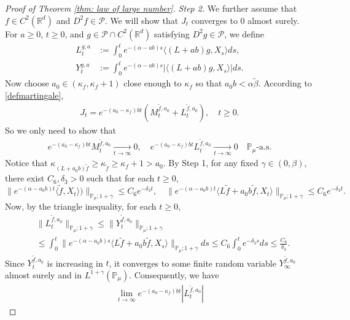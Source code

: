 \documentclass[12pt,a4paper]{amsart}
\theoremstyle{plain}
\theoremstyle{definition}
\numberwithin{equation}{section}
\begin{document}
\begin{proof}[Proof of Theorem \ref{thm: law of large number}]
  \emph{Step 2.}
  We further assume that $f\in C^2(\mathbb R^d)$ and $D^2f \in \mathcal{P}$.
  We will show that $J_t$ converges to $0$ almost surely.
  For $a \geq 0$, $ t\geq 0$, and $g\in \mathcal{P}\cap C^2(\mathbb{R}^d)$ satisfying $D^2g\in \mathcal{P}$, we define
  \begin{align}
    L_t^{g,a}
    & :=\int_0^t e^{-(\alpha-ab)s}\langle (L+ab)g,X_s\rangle ds,\\
    Y_t^{g,a}
    & :=\int_0^t e^{-(\alpha-ab)s}|\langle (L+ab)g,X_s\rangle|ds.
  \end{align}
  Now choose $a_0 \in (\kappa_{f}, \kappa_f + 1)$ close enough to $\kappa_f$ so that $a_0 b < \alpha \tilde \beta$.
  According to \eqref{defmartingale},
  \begin{align}
    J_t
    = e^{-(a_0-\kappa_f)bt} (M_t^{\widetilde{f}, a_0}+L_t^{\widetilde{f}, a_0}),
    \quad t\geq 0.
  \end{align}
  So we only need to show that
  \begin{align}
    e^{-(a_0-\kappa_f)b t}M_t^{\widetilde{f},a_0}
    \xrightarrow[t\to \infty]{} 0,
    \quad e^{-(a_0-\kappa_f)b t}L_t^{\widetilde{f},a_0}
    \xrightarrow[t\to \infty]{} 0
    \quad \mathbb{P}_{\mu}\text{-a.s.}
  \end{align}
  Notice that $\kappa_{(L+a_0 b)\widetilde{f}}\geq \kappa_{\widetilde{f}}\geq \kappa_f+1 > a_0$.
  By Step 1, for any fixed $\gamma\in (0,\beta)$, there exist $C_6, \delta_3>0$ such that for each $t\geq 0$,
  \[
    \| e^{-(\alpha-a_0 b)t}\langle \widetilde{f},X_t\rangle)\|_{\mathbb{P}_{\mu};1+\gamma}
    \leq C_6 e^{-\delta_3 t},
    \quad \|e^{-(\alpha-a_0 b)t}\langle L\widetilde{f}+a_0 b\widetilde{f},X_t\rangle\|_{\mathbb{P}_{\mu};1+\gamma}
    \leq C_6 e^{-\delta_3 t}.
  \]
  Now, by the triangle inequality, for each $t\geq 0$,
  \begin{align}
    & \|L_t^{\widetilde{f},a_0}\|_{\mathbb{P}_{\mu};1+\gamma}
      \leq\|Y_t^{\widetilde{f},a_0}\|_{\mathbb{P}_{\mu};1+\gamma} \\
    & \leq \int_0^t \|e^{-(\alpha-a_0 b)s}\langle L\widetilde{f}+a_0 b\widetilde{f},X_s\rangle\|_{\mathbb{P}_{\mu};1+\gamma}ds\leq C_6 \int_0^t e^{-\delta_3 s}ds\leq\frac{C_6}{\delta_3}.
  \end{align}
  Since $Y_t^{\widetilde{f},a_0}$ is increasing in $t$, it converges to some finite random variable $Y_{\infty}^{\widetilde{f},a_0}$ almost surely and in $L^{1+\gamma}(\mathbb{P}_{\mu})$.
  Consequently,  we have
  \begin{align}
    \lim_{t\rightarrow \infty}e^{-(a_0 - \kappa_f)bt}|L_t^{\widetilde{f},a_0}|

\end{align}
\end{proof}
\end{document}
